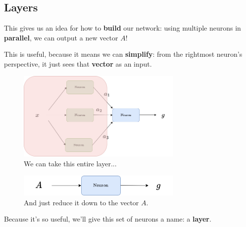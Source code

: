     \subsection{Layers}
        
        This gives us an idea for how to \textbf{build} our network: using multiple neurons in \textbf{parallel}, we can output a new vector $A$! 
        
        This is useful, because it means we can \textbf{simplify}: from the rightmost neuron's perspective, it just sees that \textbf{vector} as an input.
        
        \begin{figure}[H]
            \centering
            \includegraphics[width=80mm,scale=0.4]{images/nn_images/abstracting_A.png}
            \caption*{We can take this entire layer...}
        \end{figure}
        
        \begin{figure}[H]
            \centering
            \includegraphics[width=80mm,scale=0.4]{images/nn_images/second_layer.png}
            \caption*{And just reduce it down to the vector $A$.}
        \end{figure}

        Because it's so useful, we'll give this set of neurons a name: a \textbf{layer}.\\
        
